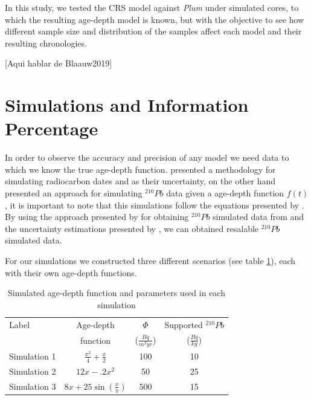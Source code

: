 \documentclass [10pt] {article}
\begin{document}
In this study, we tested the CRS model against \textit{Plum} under simulated cores, to which the resulting age-depth model is known, but with the objective to see how different sample size and distribution of the samples affect each model and their resulting chronologies.  


[Aqui hablar de Blaauw2019]

\section{Simulations and Information Percentage}
	In order to observe the accuracy and precision of any model we need data to which we know the true age-depth function. \citet{Blaauw2018} presented a methodology for simulating radiocarbon dates and as their uncertainty, on the other hand \citet{Aquino2018} presented an approach for simulating $^{210}Pb$ data given a age-depth function $f(t)$, it is important to note that this simulations follow the equations presented by \citet*{Appleby1978,Robbins1978}. By using the approach presented by \citet{Aquino2018} for obtaining $^{210}Pb$ simulated data from and the uncertainty estimations presented by \citet{Blaauw2018}, we can obtained resalable $^{210}Pb$ simulated data.

For our simulations we constructed three different scenarios (see table \ref{Tab:sim_param}), each with their own age-depth functions.

\begin{table}[!h]
		\centering
	\begin{tabular}{l|ccc}
Label    	& 	Age-depth		&	$ \Phi$		& Supported $^{210}Pb$  \\
		&	function		&	($\frac{Bq}{m^2yr }$)	& ($\frac{Bq}{kg}$) 	\\ \hline
Simulation 1 	&	$\frac{x^2}{4} + \frac{x}{2}$	&	100	& 10	\\
Simulation 2 	&	$12x -.2x^2$			&	50	& 25	\\
Simulation 3 	&	$8x+25\sin(\frac{x}{\pi})$	&	500 	& 15		
		\end{tabular}
	\label{Tab:sim_param}
	\caption{Simulated age-depth function and parameters used in each simulation}
 \end{table}
\end{document}
